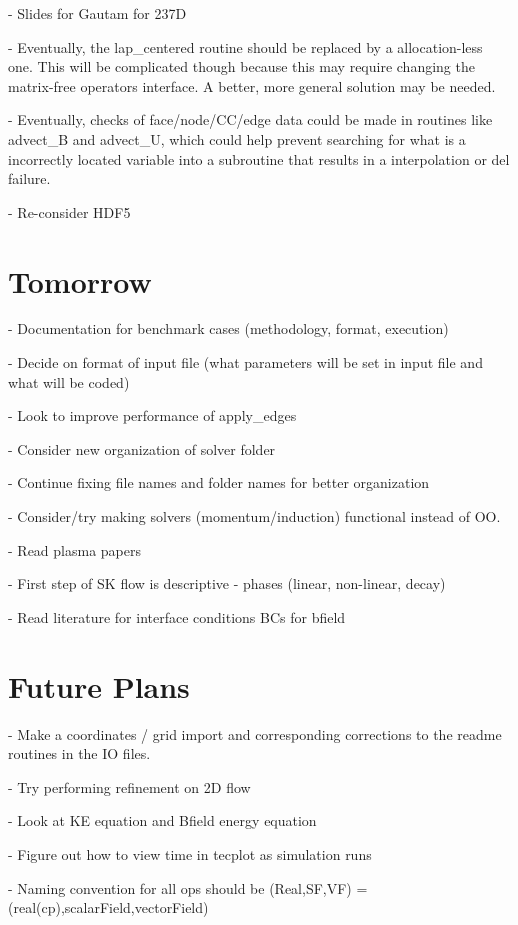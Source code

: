 \documentclass[11pt]{article}
\begin{document}
- Slides for Gautam for 237D

- Eventually, the lap\_centered routine should be replaced by a allocation-less one. This will be complicated though because this may require changing the matrix-free operators interface. A better, more general solution may be needed.

- Eventually, checks of face/node/CC/edge data could be made in routines like advect\_B and advect\_U, which could help prevent searching for what is a incorrectly located variable into a subroutine that results in a interpolation or del failure.

- Re-consider HDF5

\section{Tomorrow}

- Documentation for benchmark cases (methodology, format, execution)

- Decide on format of input file (what parameters will be set in input file and what will be coded)

- Look to improve performance of apply\_edges

- Consider new organization of solver folder

- Continue fixing file names and folder names for better organization

- Consider/try making solvers (momentum/induction) functional instead of OO.

- Read plasma papers

- First step of SK flow is descriptive - phases (linear, non-linear, decay)

- Read literature for interface conditions BCs for bfield

\section{Future Plans}

- Make a coordinates / grid import and corresponding corrections to the readme routines in the IO files.

- Try performing refinement on 2D flow

- Look at KE equation and Bfield energy equation

- Figure out how to view time in tecplot as simulation runs

- Naming convention for all ops should be (Real,SF,VF) = (real(cp),scalarField,vectorField)
\end{document}
